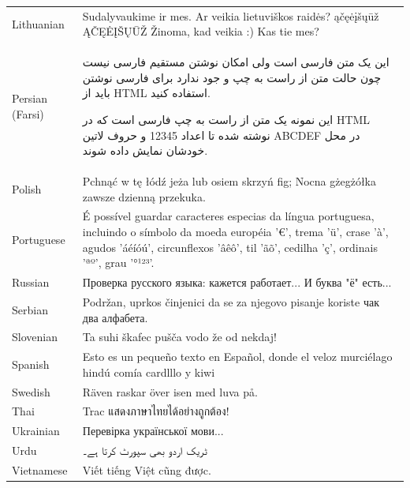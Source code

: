 \documentclass{article}
\begin{document}
\begin{table}
\begin{tabular}{|ll|}
Lithuanian & Sudalyvaukime ir mes. Ar veikia lietuviškos raidės? ąčęėįšųūž ĄČĘĖĮŠŲŪŽ Žinoma, kad veikia :) Kas tie mes?\\

Persian (Farsi) & این یک متن فارسی است ولی امکان نوشتن مستقیم فارسی نیست چون حالت متن از راست به چپ و جود ندارد برای فارسی نوشتن باید از HTML استفاده کنید.

این نمونه یک متن از راست به چپ فارسی است که در HTML نوشته شده تا اعداد 12345 و حروف لاتین ABCDEF در محل خودشان نمایش داده شوند.\\

Polish & Pchnąć w tę łódź jeża lub osiem skrzyń fig; Nocna gżegżółka zawsze dzienną przekuka.\\

Portuguese & É possível guardar caracteres especias da língua portuguesa, incluindo o símbolo da moeda européia '€', trema 'ü', crase 'à', agudos 'áéíóú', circunflexos 'âêô', til 'ãõ', cedilha 'ç', ordinais 'ªº', grau '°¹²³'.\\

Russian & Проверка русского языка: кажется работает... И буква "ё" есть...\\

Serbian & Podržan, uprkos činjenici da se za njegovo pisanje koriste чак два алфабета.\\

Slovenian & Ta suhi škafec pušča vodo že od nekdaj!\\

Spanish & Esto es un pequeño texto en Español, donde el veloz murciélago hindú comía cardlllo y kiwi\\

Swedish & Räven raskar över isen med luva på.\\

Thai & Trac แสดงภาษาไทยได้อย่างถูกต้อง!\\

Ukrainian & Перевірка української мови...\\

Urdu & ٹریک اردو بھی سپورٹ کرتا ہے۔\\

Vietnamese & Viết tiếng Việt cũng được. \\ \hline

\end{tabular}
\end{table}
\end{document}

